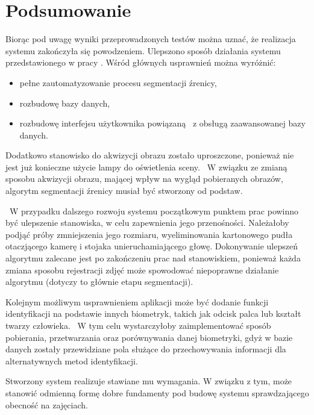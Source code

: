 \chapter{Podsumowanie}
\label{cha:podsumowanie}

Biorąc pod uwagę wyniki przeprowadzonych testów można uznać, że realizacja systemu zakończyła się powodzeniem. Ulepszono sposób działania systemu przedstawionego w pracy \cite{Gl11}. Wśród głównych usprawnień można wyróżnić:
\begin{itemize}
\item pełne zautomatyzowanie procesu segmentacji źrenicy,
\item rozbudowę bazy danych,
\item rozbudowę interfejsu użytkownika powiązaną ~z obsługą zaawansowanej bazy danych.
\end{itemize}

Dodatkowo stanowisko do akwizycji obrazu zostało uproszczone, ponieważ nie jest już konieczne użycie lampy do oświetlenia sceny. ~W związku ze zmianą sposobu akwizycji obrazu, mającej wpływ na wygląd pobieranych obrazów, algorytm segmentacji źrenicy musiał być stworzony od podstaw. 

~W przypadku dalszego rozwoju systemu początkowym punktem prac powinno być ulepszenie stanowiska, w celu zapewnienia jego przenośności. Należałoby podjąć próby zmniejszenia jego rozmiaru, wyeliminowania kartonowego pudła otaczjącego kamerę i stojaka unieruchamiającego głowę. Dokonywanie ulepszeń algorytmu zalecane jest po zakończeniu prac nad stanowiskiem, ponieważ każda zmiana sposobu rejestracji zdjęć może spowodować niepoprawne działanie algorytmu (dotyczy to głównie etapu segmentacji).

Kolejnym możliwym usprawnieniem aplikacji może być dodanie funkcji identyfikacji na podstawie innych biometryk, takich jak odcisk palca lub kształt twarzy człowieka. ~W tym celu wystarczyłoby zaimplementować sposób pobierania, przetwarzania oraz porównywania danej biometryki, gdyż w bazie danych zostały przewidziane pola służące do przechowywania informacji dla alternatywnych metod identyfikacji.

Stworzony system realizuje stawiane mu wymagania. W związku z tym, może stanowić odmienną formę dobre fundamenty pod budowę systemu sprawdzającego obecność na zajęciach.
